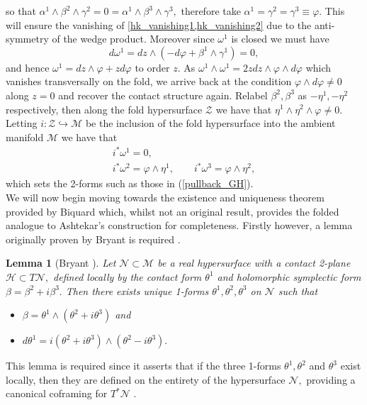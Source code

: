 \documentclass[a4paper,12pt, onecolumn, notitlepage]{article}
\newtheorem{lem}[thm]{Lemma}
\theoremstyle{definition}
\theoremstyle{remark}
\newcommand{\al}{\alpha}
\newcommand{\w}{\omega}
\newcommand{\vp}{\varphi}
\begin{document}
so that $\al^{1}\wedge\beta^{2}\wedge\gamma^{2} = 0 = \al^{1}\wedge\beta^{3}\wedge\gamma^{3},$ therefore take $\al^{1}=\gamma^{2}=\gamma^{3}\equiv\varphi.$ This will ensure the vanishing of \cref{hk_vanishing1,hk_vanishing2} due to the anti-symmetry of the wedge product. Moreover since $\w^{1}$ is closed we must have 
\begin{equation*}
	d\w^{1}	= dz\wedge (-d\varphi + \beta^{1}\wedge\gamma^{1})
	= 0,
\end{equation*}
and hence $\w^{1} = dz\wedge\varphi + zd\varphi$ to order $z.$ As $\w^{1}\wedge\w^{1} = 2zdz\wedge\varphi\wedge d\varphi$ which vanishes transversally on the fold, we arrive back at the condition $\varphi\wedge d\varphi\neq 0$ along $z=0$ and recover the contact structure again. Relabel $\beta^{2},\beta^{3}$ as $-\eta^{1}, -\eta^{2}$ respectively, then along the fold hypersurface $\mathcal{Z}$ we have that $\eta^{1}\wedge\eta^{2}\wedge\vp\neq 0.$ Letting $i:\mathcal{Z}\hookrightarrow\mathcal{M}$ be the inclusion of the fold hypersurface into the ambient manifold $\mathcal{M}$ we have that
\begin{gather}
	i^{\ast}\w^{1} = 0,\nonumber\\
	\label{k_pullbacks}
	i^{\ast}\w^{2} = \vp\wedge\eta^{1},\qquad i^{\ast}\w^{3} = \vp\wedge\eta^{2},
\end{gather}
which sets the 2-forms such as those in (\ref{pullback_GH}).\\
We will now begin moving towards the existence and uniqueness theorem provided by Biquard which, whilst not an original result, provides the folded analogue to Ashtekar's construction for completeness. Firstly however, a lemma originally proven by Bryant is required \cite{bryant_2004}.\\

\begin{lem}[Bryant \cite{bryant_2004}]
	\label{bryant}
	Let $\mathcal{N}\subset\mathcal{M}$ be a real hypersurface with a contact 2-plane $\mathcal{H}\subset T\mathcal{N},$ defined locally by the contact form $\theta^{1}$ and holomorphic symplectic form $\beta = \beta^{2} + i\beta^{3}.$ Then there exists unique 1-forms $\theta^{1},\theta^{2},\theta^{3}$ on $\mathcal{N}$ such that
	\begin{itemize}
		\item $\beta = \theta^{1}\wedge(\theta^{2}+i\theta^{3})$ and
		\item $d\theta^{1}=i(\theta^{2}+i\theta^{3})\wedge (\theta^{2}-i\theta^{3}).$\\
	\end{itemize}
\end{lem}
This lemma is required since it asserts that if the three 1-forms $\theta^{1},\theta^{2}$ and $\theta^{3}$ exist locally, then they are defined on the entirety of the hypersurface $\mathcal{N},$ providing a canonical coframing for $T^{\ast}\mathcal{N}$ \cite{bryant_2004}.\\
\end{document}
